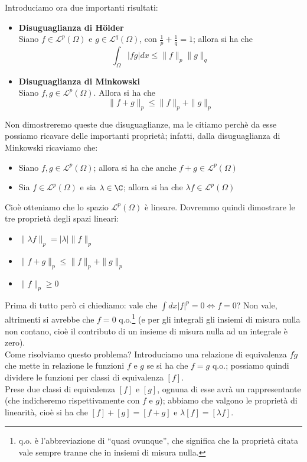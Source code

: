 Introduciamo ora due importanti risultati:
\begin{itemize}
\item \textbf{Disuguaglianza di H\"{o}lder} \\Siano $f \in \mathscr{L}^p (\Omega)$ e $g \in \mathscr{L}^q (\Omega)$, con $\frac{1}{p} + \frac{1}{q} =1$; allora si ha che \\$$\int_{\Omega} |fg|dx \leq \|f\|_p \|g\|_q$$
\item \textbf{Disuguaglianza di Minkowski} \\Siano $f, g \in  \mathscr{L}^p (\Omega)$. Allora si ha che \\$$\|f+g\|_p \leq \|f\|_p + \|g\|_p$$
\end{itemize}
Non dimostreremo queste due disuguaglianze, ma le citiamo perchè da esse possiamo ricavare delle importanti proprietà; infatti, dalla disuguaglianza di Minkowski ricaviamo che:
\begin{itemize}
\item Siano $f,g \in \mathscr{L}^p (\Omega)$; allora si ha che anche $f+g \in \mathscr{L}^p (\Omega)$
\item Sia $f \in \mathscr{L}^p (\Omega)$ e sia $\lambda \in \C$; allora si ha che $\lambda f \in \mathscr{L}^p (\Omega)$
\end{itemize}
Cioè otteniamo che lo spazio $\mathscr{L}^p (\Omega)$ è lineare.
Dovremmo quindi dimostrare le tre proprietà degli spazi lineari:
\begin{itemize}
\item $\| \lambda f\|_p=|\lambda| \|f\|_p$
\item $\|f+g\|_p \leq \|f\|_p + \|g\|_p$
\item $\|f\|_p \geq 0$
\end{itemize}
Prima di tutto però ci chiediamo: vale che $\int dx |f|^p =0 \iff f=0$? Non vale, altrimenti si avrebbe che $f=0$ q.o.\footnote{q.o. è l'abbreviazione di ``quasi ovunque'', che significa che la proprietà citata vale sempre tranne che in insiemi di misura nulla.} (e per gli integrali gli insiemi di misura nulla non contano, cioè il contributo di un insieme di misura nulla ad un integrale è zero). \\Come risolviamo questo problema? Introduciamo una relazione di equivalenza $f \tilde g$ che mette in relazione le funzioni $f$ e $g$ se si ha che $f=g$ q.o.; possiamo quindi dividere le funzioni per classi di equivalenza $[f]$. \\Prese due classi di equivalenza $[f]$ e $[g]$, ognuna di esse avrà un rappresentante (che indicheremo rispettivamente con $f$ e $g$); abbiamo che valgono le proprietà di linearità, cioè si ha che $[f]+[g]=[f+g]$ e $\lambda [f]=[\lambda f ]$.

